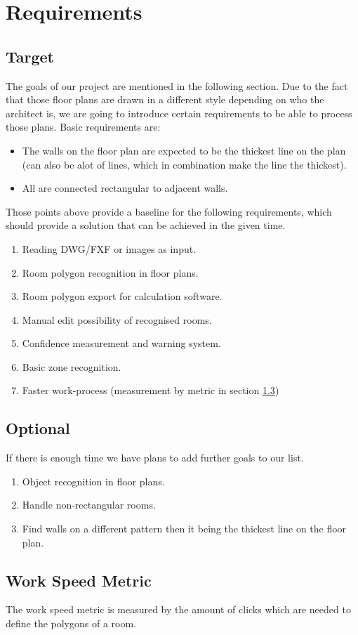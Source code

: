 \chapter{Requirements}
\section{Target}
The goals of our project are mentioned in the following section. Due to the fact that those floor plans are drawn in a different style depending on who the architect is, we are going to introduce certain requirements to be able to process those plans.
Basic requirements are:
\begin{itemize}
	\item The walls on the floor plan are expected to be the thickest line on the plan (can also be alot of lines, which in combination make the line the thickest).
	\item All are connected rectangular to adjacent walls.	
\end{itemize}

\noindent Those points above provide a baseline for the following requirements, which should provide a solution that can be achieved in the given time.

\begin{enumerate}
\item Reading DWG/FXF or images as input.
\item Room polygon recognition in floor plans.
\item Room polygon export for calculation software.
\item Manual edit possibility of recognised rooms.
\item Confidence measurement and warning system.
\item Basic zone recognition.
\item Faster work-process (measurement by metric in section \ref{sec:metric})
\end{enumerate}

\section{Optional}
If there is enough time we have plans to add further goals to our list.
\begin{enumerate}
\item Object recognition in floor plans.
\item Handle non-rectangular rooms.
\item Find walls on a different pattern then it being the thickest line on the floor plan.
\end{enumerate}

\section{Work Speed Metric}
\label{sec:metric}
The work speed metric is measured by the amount of clicks which are needed to define the polygons of a room.